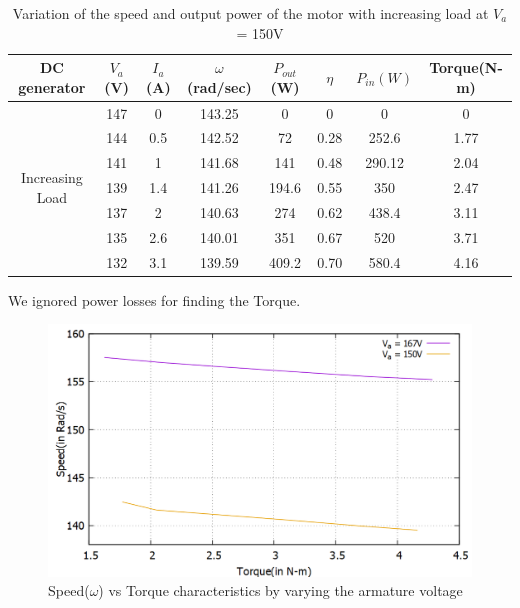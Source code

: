 \documentclass[12pt]{article}
\begin{document}
            \begin{table}[H]
                \centering
                \begin{tabular}{|c|c|c|c|c|c|c|c|}
                     \hline
                     \hline
                    DC generator & $V_a$(V) & $I_a$(A) & $\omega$(rad/sec) & $P_{out}$(W) & $\eta$ & $P_{in}(W)$ & Torque(N-m)\\
                    \hline
                    \multirow{8}{5em}{Increasing Load} & 147 & 0 & 143.25 & 0 & 0 & 0 & 0\\
                        & 144 & 0.5 & 142.52 & 72 & 0.28 & 252.6 & 1.77\\
                        & 141 & 1 & 141.68 & 141 & 0.48 & 290.12 & 2.04\\
                        & 139 & 1.4 & 141.26 & 194.6 & 0.55 & 350 & 2.47\\
                        & 137 & 2 & 140.63 & 274 & 0.62 & 438.4 & 3.11\\
                        & 135 & 2.6 & 140.01 & 351 & 0.67 & 520 & 3.71 \\
                        & 132 & 3.1 & 139.59 & 409.2 & 0.70 & 580.4 & 4.16\\

                         \hline
                         \hline
                \end{tabular}
                \caption{Variation of the speed and output power of the motor with increasing load at $V_a$ = 150V}
                \label{tab:my_label}
            \end{table}
            We ignored power losses for finding the Torque. 
                \begin{figure}[H]
                    \centering
                    \includegraphics[scale=0.5]{LAB-4/armature.png}
                    \caption{Speed($\omega$) vs Torque characteristics by varying the armature voltage}
                    \label{fig:my_label}
                \end{figure}
\end{document}
